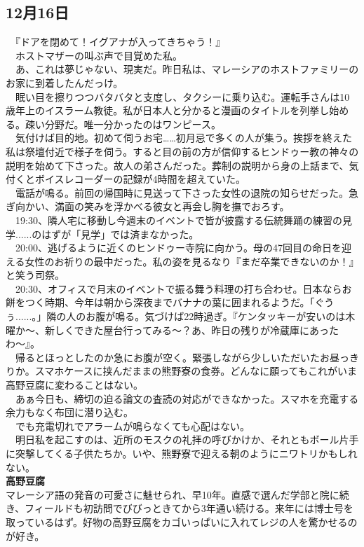 \begin{myboxnote}
\subsection{12月16日}
\noindent
　『ドアを閉めて！イグアナが入ってきちゃう！』\\
　ホストマザーの叫ぶ声で目覚めた私。\\
　あ、これは夢じゃない、現実だ。昨日私は、マレーシアのホストファミリーのお家に到着したんだっけ。\\
　眠い目を擦りつつバタバタと支度し、タクシーに乗り込む。運転手さんは10歳年上のイスラーム教徒。私が日本人と分かると漫画のタイトルを列挙し始める。疎い分野だ。唯一分かったのはワンピース。\\
　気付けば目的地。初めて伺うお宅……初月忌で多くの人が集う。挨拶を終えた私は祭壇付近で様子を伺う。すると目の前の方が信仰するヒンドゥー教の神々の説明を始めて下さった。故人の弟さんだった。葬制の説明から身の上話まで、気付くとボイスレコーダーの記録が4時間を超えていた。\\
　電話が鳴る。前回の帰国時に見送って下さった女性の退院の知らせだった。急ぎ向かい、満面の笑みを浮かべる彼女と再会し胸を撫でおろす。\\
　19:30、隣人宅に移動し今週末のイベントで皆が披露する伝統舞踊の練習の見学......のはずが「見学」では済まなかった。\\
　20:00、逃げるように近くのヒンドゥー寺院に向かう。母の47回目の命日を迎える女性のお祈りの最中だった。私の姿を見るなり『まだ卒業できないのか！』と笑う司祭。\\
　20:30、オフィスで月末のイベントで振る舞う料理の打ち合わせ。日本ならお餅をつく時期、今年は朝から深夜までバナナの葉に囲まれるようだ。「ぐうぅ......。」隣の人のお腹が鳴る。気づけば22時過ぎ。『ケンタッキーが安いのは木曜か〜、新しくできた屋台行ってみる〜？あ、昨日の残りが冷蔵庫にあったわ〜』。\\
　帰るとほっとしたのか急にお腹が空く。緊張しながら少しいただいたお昼っきりか。スマホケースに挟んだままの熊野寮の食券。どんなに願ってもこれがいま高野豆腐に変わることはない。\\
　あぁ今日も、締切の迫る論文の査読の対応ができなかった。スマホを充電する余力もなく布団に潜り込む。\\
　でも充電切れでアラームが鳴らなくても心配はない。\\
　明日私を起こすのは、近所のモスクの礼拝の呼びかけか、それともボール片手に突撃してくる子供たちか。いや、熊野寮で迎える朝のようにニワトリかもしれない。\\

\vspace{1mm}
\noindent
\textbf{高野豆腐}\\
マレーシア語の発音の可愛さに魅せられ、早10年。直感で選んだ学部と院に続き、フィールドも初訪問でびびっときてから3年通い続ける。来年には博士号を取っているはず。好物の高野豆腐をカゴいっぱいに入れてレジの人を驚かせるのが好き。

\end{myboxnote}
\vspace{1em}

